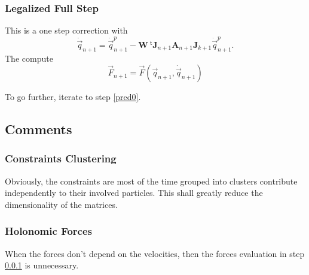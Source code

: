 \documentclass[aps,twocolumn]{revtex4}
\newcommand{\mymat}[1]{\boldsymbol{#1}}
\newcommand{\mytrn}[1]{{\!\!~^{\mathsf{t}}{#1}}}
\newcommand{\q}{\vec{q}}
\newcommand{\dq}{\dot{\q}}
\newcommand{\J}{\mymat{J}}
\newcommand{\tJ}{\mytrn{\J}}
\newcommand{\W}{\mymat{W}}
\newcommand{\A}{\mymat{A}}
\begin{document}
\subsubsection{Legalized Full Step}
\label{final}
This is a one step correction with
$$
	\dq_{n+1} = \dq_{n+1}^p - \W\tJ_{n+1} \A_{n+1} \J_{k+1} \dq_{n+1}^p.
$$
The compute
$$
	\vec{F}_{n+1} = \vec{F}\left(\q_{n+1},\dq_{n+1}\right)
$$

To go further, iterate to step \ref{pred0}.

\subsection{Comments}

\subsubsection{Constraints Clustering}
Obviously, the constraints are most of the time grouped into clusters contribute
independently to their involved particles. This shall greatly reduce the dimensionality of the matrices.

\subsubsection{Holonomic Forces}
When the forces don't depend on the velocities, then the forces evaluation in step \ref{final} is unnecessary.
\end{document}
